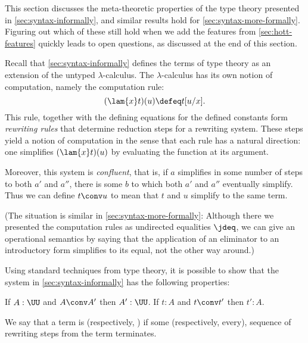 This section discusses the meta-theoretic properties of the type theory presented in 
\cref{sec:syntax-informally}, and similar results hold for \cref{sec:syntax-more-formally}. Figuring out which of these still hold when we add the features from \cref{sec:hott-features} quickly leads to open questions, as discussed at the end of this section.

Recall that \cref{sec:syntax-informally} defines the terms of type theory as
an extension of the untyped $\lambda$-calculus. The $\lambda$-calculus 
has its own notion of computation, namely the computation rule: 
\[
  (\lam{x} t)(u) \defeq t[u/x].
\]
This rule, together with the defining equations for the defined constants form
\emph{rewriting rules} that determine reduction steps for a rewriting 
system. These steps yield a notion of computation in the sense that each rule
has a natural direction: one simplifies $(\lam{x} t)(u)$ by evaluating the
function at its argument.

Moreover, this system is \emph{confluent}, that is, if $a$ simplifies in some
number of steps to both $a'$ and $a''$, there is some $b$ to which both $a'$ and
$a''$ eventually simplify. Thus we can define $t\conv u$ to mean that $t$ and
$u$ simplify to the same term.

(The situation is similar in \cref{sec:syntax-more-formally}: Although there
we presented the computation rules as undirected equalities $\jdeq$, we can give
an operational semantics by saying that the application of an eliminator to an
introductory form simplifies to its equal, not the other way around.)

Using standard techniques from type theory, it is possible to show that the system in \cref{sec:syntax-informally}
has the following properties:

\begin{thm}\label{thm:conversion-preserves-typing}
If $A : \UU$ and $A \conv A'$ then $A' : \UU$.
If $t:A$ and $t \conv t'$ then $t':A$.
\end{thm}

We say that a term is 
%
%
%
(respectively, )
%
%
%
if some (respectively, every), sequence of rewriting steps from the term
terminates.

